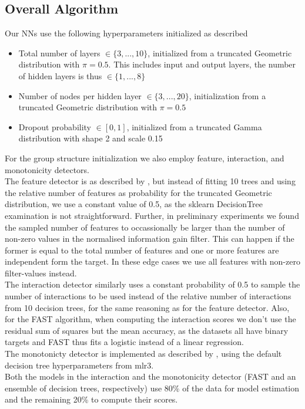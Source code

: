 \documentclass[twoside,11pt]{article}
\begin{document}
\subsection{Overall Algorithm}
Our NNs use the following hyperparameters initialized as described
\begin{itemize}
  \item Total number of layers $\in\{3, ..., 10\}$, initialized from a truncated Geometric distribution with $\pi=0.5$.
        This includes input and output layers, the number of hidden layers is thus $\in\{1, ..., 8\}$
  \item Number of nodes per hidden layer $\in\{3, ..., 20\}$, initialization from a truncated Geometric distribution with $\pi=0.5$
  \item Dropout probability $\in[0, 1]$, initialized from a truncated Gamma distribution with shape 2 and scale 0.15
\end{itemize}
For the group structure initialization we also employ feature, interaction, and monotonicity detectors.
\\
The feature detector is as described by \citet[p. 542]{EAGGA}, but instead of fitting 10 trees and using the relative number of features as
probability for the truncated Geometric distribution, we use a constant value of 0.5, as the sklearn DecisionTree examination is not straightforward.
Further, in preliminary experiments we found the sampled number of features to occassionally be larger than the number of non-zero values in the
normalised information gain filter. This can happen if the former is equal to the total number of features and one or more features are independent form the
target. In these edge cases we use all features with non-zero filter-values instead.
\\
The interaction detector similarly uses a constant probability of 0.5 to sample the number of interactions to be used instead of the relative number of interactions
from 10 decision trees, for the same reasoning as for the feature detector. Also, for the FAST algorithm, when computing the interaction scores we don't
use the residual sum of squares but the mean accuracy, as the datasets all have binary targets and FAST thus fits a logistic instead of a linear regression.
\\
The monotonicty detector is implemented as described by \citet[p. 543]{EAGGA}, using the default decision tree hyperparameters from mlr3.
\\
Both the models in the interaction and the monotonicity detector (FAST and an ensemble of decision trees, respectively) use 80\% of the data for model estimation and
the remaining 20\% to compute their scores.
\end{document}
